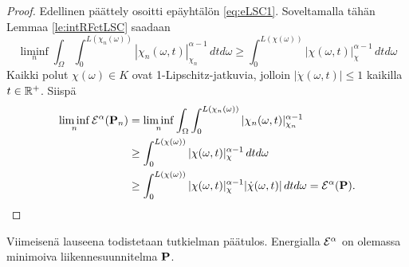 \documentclass[12pt,oneside,a4paper]{amsbook} %
\begin{document}
\begin{proof}
    Edellinen päättely osoitti epäyhtälön \eqref{eq:eLSC1}. Soveltamalla tähän Lemmaa \ref{le:intRFctLSC} saadaan
    \begin{equation*}
        \liminf_n \int_\Omega \int_0^{L(\chi_n(\omega))}|\chi_n(\omega, t)|_{\chi_n}^{\alpha-1} \, dtd\omega\ge \int_0^{L(\chi(\omega))}|\chi(\omega, t)|_{\chi}^{\alpha-1} \, dtd\omega
    \end{equation*}
    Kaikki polut  $\chi(\omega) \in K$ ovat 1-Lipschitz-jatkuvia, jolloin $|\dot \chi(\omega, t)| \le 1$ kaikilla $t \in \R^+$. Siispä
    \begin{align*}
         \liminf_n \E^\alpha(\P_n) &=  \liminf_n \int_\Omega \int_0^{L(\chi_n(\omega))}|\chi_n(\omega, t)|_{\chi_n}^{\alpha-1} \\
         &\ge \int_0^{L(\chi(\omega))}|\chi(\omega, t)|_{\chi}^{\alpha-1} \, dtd\omega \\
         &\ge \int_0^{L(\chi(\omega))}|\chi(\omega, t)|_{\chi}^{\alpha-1}|\dot \chi(\omega, t)| \, dtd\omega = \E^\alpha(\P).
    \end{align*}
\end{proof}

Viimeisenä lauseena todistetaan tutkielman päätulos. Energialla $\E^\alpha$ on olemassa minimoiva liikennesuunnitelma $\P$.
\end{document}
